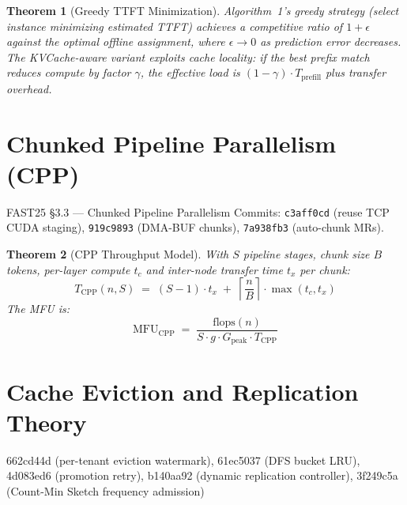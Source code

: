 \documentclass[11pt,a4paper,twoside]{article}
\theoremstyle{plain}
\newtheorem{theorem}{Theorem}[section]
\theoremstyle{definition}
\theoremstyle{remark}
\begin{document}
\begin{theorem}[Greedy TTFT Minimization]
\label{thm:greedy-ttft}
Algorithm~1's greedy strategy (select instance minimizing estimated TTFT) achieves
a competitive ratio of $1 + \epsilon$ against the optimal offline assignment, where
$\epsilon \to 0$ as prediction error decreases.  The KVCache-aware variant exploits
cache locality: if the best prefix match reduces compute by factor $\gamma$, the
effective load is $(1-\gamma) \cdot T_{\text{prefill}}$ plus transfer overhead.
\end{theorem}


\section{Chunked Pipeline Parallelism (CPP)}
\label{sec:cpp}

\begin{commitbox}{FAST25 \S3.3 --- Chunked Pipeline Parallelism}
Commits: \texttt{c3aff0cd} (reuse TCP CUDA staging), \texttt{919c9893} (DMA-BUF chunks),
\texttt{7a938fb3} (auto-chunk MRs).
\end{commitbox}

\begin{theorem}[CPP Throughput Model]
\label{thm:cpp}
With $S$ pipeline stages, chunk size $B$ tokens, per-layer compute $t_c$ and inter-node
transfer time $t_x$ per chunk:
\begin{equation}
  T_{\text{CPP}}(n, S) \;=\; (S-1) \cdot t_x \;+\;
  \left\lceil \frac{n}{B} \right\rceil \cdot \max(t_c, t_x)
\end{equation}
The MFU is:
\begin{equation}
  \text{MFU}_{\text{CPP}} \;=\;
  \frac{\mathrm{flops}(n)}{S \cdot g \cdot G_{\text{peak}} \cdot T_{\text{CPP}}}
\end{equation}
\end{theorem}


\section{Cache Eviction and Replication Theory}
\label{sec:cache}

\begin{commitbox}{662cd44d (per-tenant eviction watermark), 61ec5037 (DFS bucket LRU),
4d083ed6 (promotion retry), b140aa92 (dynamic replication controller),
3f249c5a (Count-Min Sketch frequency admission)}
\end{commitbox}
\end{document}
